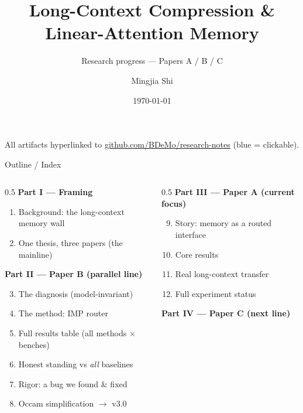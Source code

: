 \documentclass[aspectratio=169]{beamer}
\title[Long-Context Memory]{Long-Context Compression \& Linear-Attention Memory}
\subtitle{Research progress --- Papers A / B / C}
\author{Mingjia Shi}
\institute{RCA Foundation Model / Long-Context Memory}
\date{\today}
\begin{document}
\begin{frame}\titlepage
  \begin{center}\scriptsize All artifacts hyperlinked to
  \href{https://github.com/BDeMo/research-notes}{\color{blue}\underline{github.com/BDeMo/research-notes}} (blue = clickable).\end{center}
\end{frame}

\begin{frame}{Outline / Index}
  \begin{columns}[T]
  \begin{column}{0.5\textwidth}
  \textbf{Part I --- Framing}
  \begin{enumerate}\small
    \item Background: the long-context memory wall
    \item One thesis, three papers (the mainline)
  \end{enumerate}
  \vspace{0.6em}
  \textbf{Part II --- Paper B (parallel line)}
  \begin{enumerate}\setcounter{enumi}{2}\small
    \item The diagnosis (model-invariant)
    \item The method: IMP router
    \item Full results table (all methods $\times$ benches)
    \item Honest standing vs \emph{all} baselines
    \item Rigor: a bug we found \& fixed
    \item Occam simplification $\to$ v3.0
  \end{enumerate}
  \end{column}
  \begin{column}{0.5\textwidth}
  \textbf{Part III --- Paper A (current focus)}
  \begin{enumerate}\setcounter{enumi}{8}\small
    \item Story: memory as a routed interface
    \item Core results
    \item Real long-context transfer
    \item Full experiment status
  \end{enumerate}
  \vspace{0.6em}
  \textbf{Part IV --- Paper C (next line)}
  \begin{enumerate}\setcounter{enumi}{12}\small

\end{enumerate}
\end{column}
\end{columns}
\end{frame}
\end{document}
